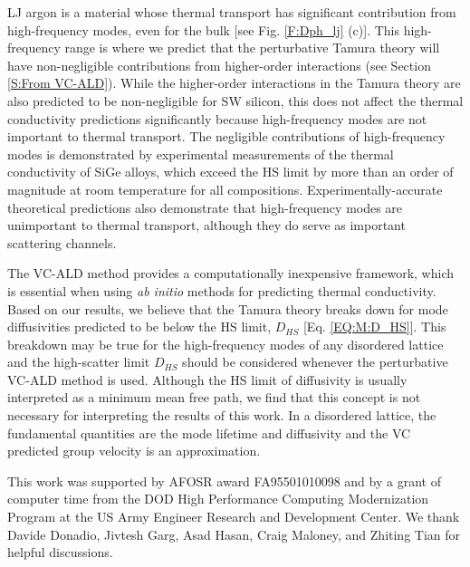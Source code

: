 \documentclass[12pt,twocolumn,iop]{/usr/share/texmf-texlive/tex/latex/iop/iopart}[/usr/share/texmf-texlive/tex/latex/iop/]
\begin{document}
LJ argon is a material whose thermal transport has significant 
contribution from high-frequency modes, even for the bulk 
[see Fig. \ref{F:Dph_lj} (c)]. 
This high-frequency range is where we predict that the 
perturbative Tamura theory   
will have non-negligible contributions from higher-order 
interactions (see Section \ref{S:From VC-ALD}). 
While the higher-order interactions in the 
Tamura theory are also predicted to be 
non-negligible for SW silicon, this does not affect the thermal 
conductivity predictions significantly because high-frequency modes  
are not important to thermal transport. The negligible contributions 
of high-frequency modes is demonstrated by experimental measurements 
of the thermal conductivity of SiGe alloys, which exceed the HS limit 
by more than an order of magnitude at room temperature for all 
compositions.
\cite{cahill_lattice_1988,cahill_thermal_2004,
cahill_thermal_2005,cheaito_experimental_2012} Experimentally-accurate 
theoretical predictions\cite{garg_role_2011} 
also demonstrate that high-frequency modes 
are unimportant to thermal transport, 
although they do serve as important scattering channels.
\cite{ward_intrinsic_2010} 

The VC-ALD method provides a computationally inexpensive framework, 
which is 
essential when using \emph{ab initio} 
methods for predicting thermal conductivity.
\cite{ward_intrinsic_2010,lindsay_thermal_2012,
garg_role_2011,
shiga_microscopic_2012,tian_phonon_2012,
shiomi_thermal_2011,esfarjani_heat_2011,
li_thermal_2012,luckyanova_coherent_2012} Based on our results, 
we believe that the Tamura theory breaks down for mode  
diffusivities predicted to be below the HS limit, $D_{HS}$ 
[Eq. \eqref{EQ:M:D_HS}]. 
This breakdown may be true for the high-frequency modes of any 
disordered lattice\cite{sheng_heat_1991} 
and the high-scatter limit $D_{HS}$ should be 
considered whenever the perturbative VC-ALD method is used.
Although the HS limit of 
diffusivity is usually interpreted as a minimum mean free path,
\cite{kittel_interpretation_1949,graebner_phonon_1986,
cahill_lattice_1988,sheng_heat_1991} 
we find that this concept is not necessary for interpreting the results 
of this work. In a disordered lattice, the fundamental quantities are 
the mode lifetime and diffusivity\cite{sheng_heat_1991,allen_thermal_1993,
allen_diffusons_1999,taraskin_determination_1999} and the 
VC predicted group velocity is an approximation.

\begin{acknowledgements}
This work was supported by AFOSR award FA95501010098 and by a grant 
of computer time from the DOD 
High Performance Computing Modernization Program at the US Army Engineer 
Research and Development Center. 
We thank Davide Donadio, Jivtesh Garg, Asad Hasan, Craig Maloney, 
and Zhiting Tian for helpful discussions.
\end{acknowledgements}
\end{document}
